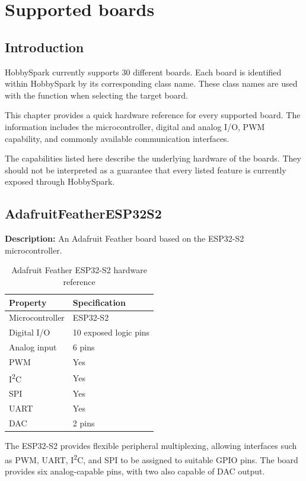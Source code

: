 

\chapter{Supported boards}

\section{Introduction}

HobbySpark currently supports 30 different boards. Each board is identified
within HobbySpark by its corresponding class name. These class names are used
with the  function when selecting the target board.

This chapter provides a quick hardware reference for every supported board.
The information includes the microcontroller, digital and analog I/O,
PWM capability, and commonly available communication interfaces.

The capabilities listed here describe the underlying hardware of the boards.
They should not be interpreted as a guarantee that every listed feature is
currently exposed through HobbySpark.

\section{AdafruitFeatherESP32S2}

\textbf{Description:} An Adafruit Feather board based on the ESP32-S2
microcontroller.

\begin{table}[H]
\centering
\caption{Adafruit Feather ESP32-S2 hardware reference}
\label{tab:board-feather-esp32s2}
\begin{tabular}{ll}
\toprule
\textbf{Property} & \textbf{Specification} \\
\midrule
Microcontroller & ESP32-S2 \\
Digital I/O & 10 exposed logic pins \\
Analog input & 6 pins \\
PWM & Yes \\
I\textsuperscript{2}C & Yes \\
SPI & Yes \\
UART & Yes \\
DAC & 2 pins \\
\bottomrule
\end{tabular}
\end{table}

The ESP32-S2 provides flexible peripheral multiplexing, allowing interfaces
such as PWM, UART, I\textsuperscript{2}C, and SPI to be assigned to suitable
GPIO pins. The board provides six analog-capable pins, with two also capable
of DAC output.

